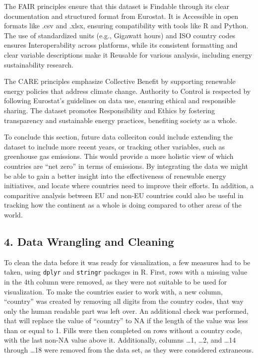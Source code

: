 \documentclass[
  letterpaper,
  DIV=11,
  numbers=noendperiod]{scrartcl}
\begin{document}
The FAIR principles ensure that this dataset is Findable through its
clear documentation and structured format from Eurostat. It is
Accessible in open formats like .csv and .xlsx, ensuring compatibility
with tools like R and Python. The use of standardized units (e.g.,
Gigawatt hours) and ISO country codes ensures Interoperability across
platforms, while its consistent formatting and clear variable
descriptions make it Reusable for various analysis, including energy
sustainability research.

The CARE principles emphasize Collective Benefit by supporting renewable
energy policies that address climate change. Authority to Control is
respected by following Eurostat's guidelines on data use, ensuring
ethical and responsible sharing. The dataset promotes Responsibility and
Ethics by fostering transparency and sustainable energy practices,
benefiting society as a whole.

To conclude this section, future data colleciton could include extending
the dataset to include more recent years, or tracking other variables,
such as greenhouse gas emissions. This would provide a more holistic
view of which countries are ``net zero'' in terms of emissions. By
integrating the data we might be able to gain a better insight into the
effectiveness of renewable energy initiatives, and locate where
countries need to improve their efforts. In addition, a comparitive
analysis between EU and non-EU countries could also be useful in
tracking how the continent as a whole is doing compared to other areas
of the world.

\subsection{4. Data Wrangling and
Cleaning~}\label{data-wrangling-and-cleaning}

To clean the data before it was ready for visualization, a few measures
had to be taken, using \texttt{dplyr} and \texttt{stringr} packages in
R. First, rows with a missing value in the 4th column were removed, as
they were not suitable to be used for visualization. To make the
countries easier to work with, a new column, ``country'' was created by
removing all digits from the country codes, that way only the human
readable part was left over. An additional check was performed, that
will replace the value of ``country'' to NA if the length of the value
was less than or equal to 1. Fills were then completed on rows without a
country code, with the last non-NA value above it. Additionally, columns
\ldots1, \ldots2, and \ldots14 through \ldots18 were removed from the
data set, as they were considered extraneous.
\end{document}
